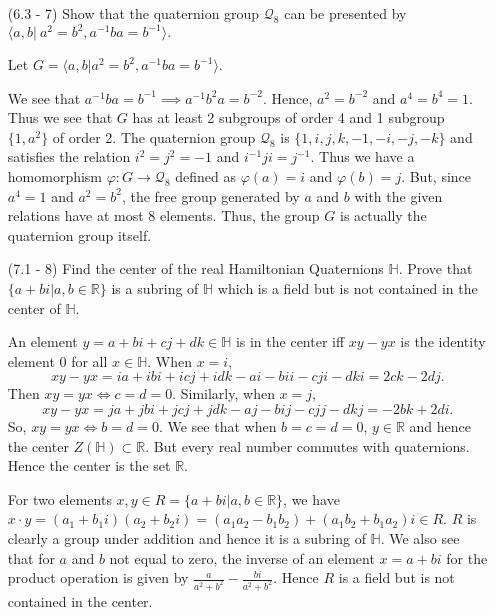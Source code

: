 \documentclass[12pt]{article}
\newcommand{\rl}{\mathbb{R}}
\begin{document}
\begin{enumerate}
\item[(6.3 - 7)] Show that the quaternion group
    $\mathcal{Q}_8$ can be presented by $\langle
        a, b|\ a^2 =
    b^2, a^{-1}ba = b^{-1}\rangle.$
\begin{mybox}
    
    Let $G=\langle a, b|a^2=b^2,a^{-1}ba = b^{-1}\rangle$.
    
    \vspace*{2mm}
    We see that $
    a^{-1}ba=b^{-1}\implies a^{-1}b^2a=b^{-2}$. Hence,
    $a^2=b^{-2}$ and $a^4=b^4=1$. Thus we see that $G$
    has at least 2 subgroups of order 4 and 1 subgroup
    $\{1, a^2\}$ of order 2. The quaternion group
    $\mathcal{Q}_8$ is $\{1,i,j,k,-1,-i,-j,-k\}$ and
    satisfies the relation $i^2=j^2=-1$ and $i^{-1}ji
    =j^{-1}$. Thus we have a homomorphism $\varphi:G
    \to \mathcal{Q}_8$ defined as
    $\varphi(a)=i$ and $\varphi(b)=j$. But, since 
    $a^4=1$ and $a^2=b^2$, the free group generated by
    $a$ and $b$ with the given relations have at most 8
    elements. Thus, the group $G$ is actually the
    quaternion group itself.
\end{mybox}

\item[(7.1 - 8)] Find the center of the real Hamiltonian
    Quaternions $\mathbb{H}$. Prove that
    $\{a + bi|a, b\in \rl\}$ is a subring of $\mathbb{H}$
    which is a field but is not contained in the
    center of $\mathbb{H}$.
\begin{mybox}

    An element $y=a+bi+cj+dk\in\mathbb{H}$ is in the
    center iff $xy-yx$ is the identity
    element $0$ for all $x\in\mathbb{H}$. When
    $x=i$, $$xy-yx=ia+ibi+icj+idk-ai-bii-cji-dki
    =2ck-2dj.$$
    Then $xy=yx\iff c=d=0$. Similarly, when $x=j$,
    $$xy-yx=ja+jbi+jcj+jdk-aj-bij-cjj-dkj
    =-2bk+2di.$$
    So, $xy=yx\iff b=d=0$. We see that
    when $b=c=d=0$, $y\in\mathbb{R}$ and hence the center
    $Z(\mathbb{H})\subset\mathbb{R}$. But every real
    number commutes with quaternions. Hence the center is
    the set $\mathbb{R}$.

    \vspace*{3mm}
    For two elements $x, y\in R=\{a + bi|a, b\in \rl\}$,
    we have $x\cdot y=(a_1+b_1i)(a_2+b_2i)
    =(a_1a_2-b_1b_2)+(a_1b_2+b_1a_2)i\in R$. $R$ is clearly
    a group under addition and hence it is a subring of
    $\mathbb{H}$. We also see that for $a$ and $b$ not
    equal to zero, the inverse of an element $x=a+bi$
    for the product operation is given by
    $\frac{a}{a^2+b^2}-\frac{bi}{a^2+b^2}$.
    Hence $R$ is a field but is not contained in the
    center.
\end{mybox}


\end{enumerate}
\end{document}
